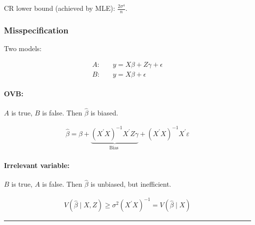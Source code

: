 CR lower bound (achieved by MLE): $\frac{2\sigma^4}{n}$.

\subsubsection{Misspecification}

Two models:

\begin{align*}
    A:&\quad y=X \beta+Z \gamma+\epsilon \\
    B:&\quad y=X \beta+\epsilon
\end{align*}

\paragraph{OVB:}

$A$ is true, $B$ is false. Then $\hat{\beta}$ is biased.

\begin{align*}
    \hat{\beta}=\beta+\underbrace{\left(X^{\prime} X\right)^{-1} X^{\prime} Z \gamma}_{\text {Bias }}+\left(X^{\prime} X\right)^{-1} X^{\prime} \varepsilon
\end{align*}

\paragraph{Irrelevant variable:}

$B$ is true, $A$ is false. Then $\hat{\beta}$ is unbiased, but inefficient.

\begin{align*}
    V(\hat{\beta} \mid X, Z) \geq \sigma^2\left(X^{\prime} X\right)^{-1}=V(\hat{\beta} \mid X)
\end{align*}

\hrule
